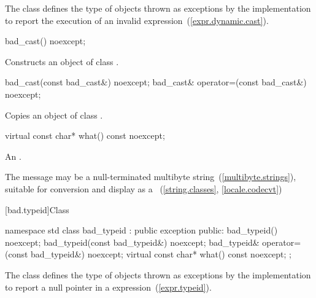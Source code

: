 \pnum
The class
defines the type of objects thrown
as exceptions by the implementation to report the execution of an invalid
expression~(\ref{expr.dynamic.cast}).

%
%
\begin{itemdecl}
bad_cast() noexcept;
\end{itemdecl}

\begin{itemdescr}
\pnum
\effects
Constructs an object of class
.
\end{itemdescr}

%
%
\begin{itemdecl}
bad_cast(const bad_cast&) noexcept;
bad_cast& operator=(const bad_cast&) noexcept;
\end{itemdecl}

\begin{itemdescr}
\pnum
\effects
Copies an object of class
.
\end{itemdescr}

%
\begin{itemdecl}
virtual const char* what() const noexcept;
\end{itemdecl}

\begin{itemdescr}
\pnum
\returns
An  \ntbs.%

\pnum
\notes
The message may be a null-terminated multibyte string~(\ref{multibyte.strings}),
suitable for conversion and display as a
~(\ref{string.classes}, \ref{locale.codecvt})
\end{itemdescr}

[bad.typeid]{Class }

%
\begin{codeblock}
namespace std {
  class bad_typeid : public exception {
  public:
    bad_typeid() noexcept;
    bad_typeid(const bad_typeid&) noexcept;
    bad_typeid& operator=(const bad_typeid&) noexcept;
    virtual const char* what() const noexcept;
  };
}
\end{codeblock}

\pnum
The class
defines the type of objects
thrown as exceptions by the implementation to report a null pointer
in a
expression~(\ref{expr.typeid}).

